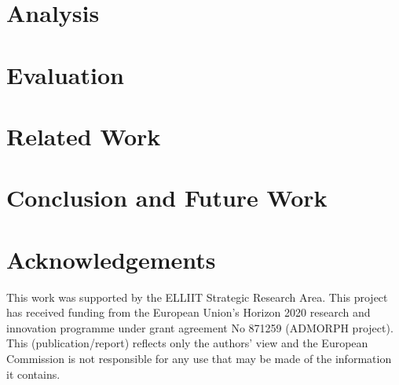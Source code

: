 \section{Analysis}
\label{sec:anl}


\section{Evaluation}
\label{sec:eval}


\section{Related Work}
\label{sec:rel}


\section{Conclusion and Future Work}
\label{sec:concl}


\section*{Acknowledgements}
This work was supported by the ELLIIT Strategic Research Area.
This project has received funding from the European Union's Horizon 2020 research and innovation programme under grant agreement No 871259 (ADMORPH project). This (publication/report) reflects only the authors' view and the European Commission is not responsible for any use that may be made of the information it contains.


\printbibliography[heading=subbibliography]
